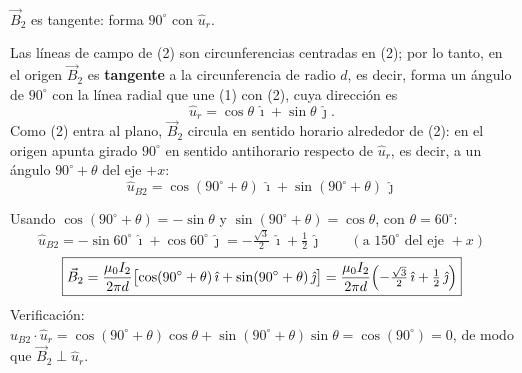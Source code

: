 \documentclass[12pt,letterpaper]{article}
\newcommand{\punto}[2][black]{%
  \draw[#1,line width=0.8pt,fill=white] (#2) circle (0.22);
  \fill[#1] (#2) circle (0.05);}
\newcommand{\cruz}[2][black]{%
  \draw[#1,line width=0.8pt,fill=white] (#2) circle (0.22);
  \draw[#1,line width=0.8pt] ($(#2)+(-0.155,-0.155)$)--($(#2)+(0.155,0.155)$)
        ($(#2)+(-0.155,0.155)$)--($(#2)+(0.155,-0.155)$);}
\begin{document}
\noindent
\begin{minipage}[c]{0.38\textwidth}
\centering
{}\\[2pt]
{\footnotesize $\vec{B}_2$ es tangente: forma $90^\circ$ con $\hat{u}_r$.}
\end{minipage}%
\hfill
\begin{minipage}[c]{0.58\textwidth}
Las l\'ineas de campo de (2) son circunferencias centradas en (2); por lo tanto, en el origen
$\vec{B}_2$ es \textbf{tangente} a la circunferencia de radio $d$, es decir, forma un \'angulo de
$90^\circ$ con la l\'inea radial que une (1) con (2), cuya direcci\'on es
\[
    \hat{u}_r = \cos\theta\,\hat{\imath} + \sin\theta\,\hat{\jmath}.
\]
Como (2) entra al plano, $\vec{B}_2$ circula en sentido horario alrededor de (2): en el origen
apunta girado $90^\circ$ en sentido antihorario respecto de $\hat{u}_r$, es decir, a un \'angulo
$90^\circ+\theta$ del eje $+x$:
\[
    \hat{u}_{B2} = \cos(90^\circ+\theta)\,\hat{\imath} + \sin(90^\circ+\theta)\,\hat{\jmath}
\]
\end{minipage}

\medskip
\noindent Usando $\cos(90^\circ+\theta) = -\sin\theta$ y $\sin(90^\circ+\theta) = \cos\theta$, con
$\theta = 60^\circ$:
\[
    \hat{u}_{B2} = -\sin60^\circ\,\hat{\imath} + \cos60^\circ\,\hat{\jmath}
    = -\tfrac{\sqrt{3}}{2}\,\hat{\imath} + \tfrac{1}{2}\,\hat{\jmath}
    \qquad(\text{a } 150^\circ \text{ del eje } +x)
\]
\[
    \boxed{\vec{B}_2 = \frac{\mu_0 I_2}{2\pi d}\bigl[\cos(90^\circ+\theta)\,\hat{\imath} + \sin(90^\circ+\theta)\,\hat{\jmath}\bigr]
    = \frac{\mu_0 I_2}{2\pi d}\Bigl(-\tfrac{\sqrt{3}}{2}\,\hat{\imath} + \tfrac{1}{2}\,\hat{\jmath}\Bigr)}
\]
\noindent Verificaci\'on: $\hat{u}_{B2}\cdot\hat{u}_r = \cos(90^\circ+\theta)\cos\theta + \sin(90^\circ+\theta)\sin\theta
= \cos(90^\circ) = 0$, de modo que $\vec{B}_2\perp\hat{u}_r$.
\end{document}
